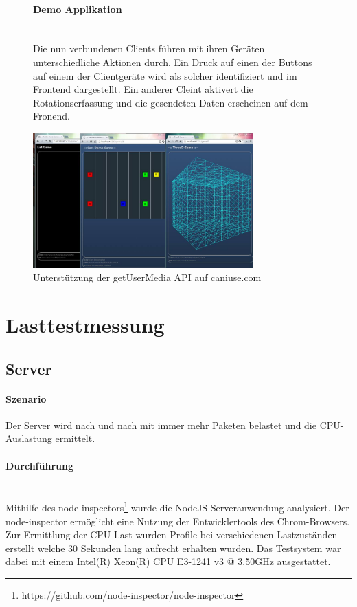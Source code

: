 \documentclass[a4paper]{spie}  %
\begin{document}
\begin{figure}[H]
\begin{minipage}[t]{0.4\textwidth}
\vspace{0pt}
\paragraph{Demo Applikation}\mbox{}\\
Die nun verbundenen Clients führen mit ihren Geräten unterschiedliche Aktionen durch. Ein Druck auf einen der Buttons auf einem der Clientgeräte wird als solcher identifiziert und im Frontend dargestellt. Ein anderer Cleint aktivert die Rotationserfassung und die gesendeten Daten erscheinen auf dem Fronend.

\end{minipage}
\hfill
\begin{minipage}[t]{0.5\textwidth}
\vspace{0pt}
    \includegraphics[width=8.5cm]{images/demoGames}
     \caption{Unterstützung der getUserMedia API auf caniuse.com}
		\label{fig:test2}
\end{minipage}
\end{figure}

\section{Lasttestmessung}\label{Lasttestmessung} %

\subsection{Server}

\paragraph{Szenario} 
Der Server wird nach und nach mit immer mehr Paketen belastet und die CPU-Auslastung ermittelt.


\paragraph{Durchführung}\mbox{}\\
Mithilfe des node-inspectors\footnote{https://github.com/node-inspector/node-inspector} wurde die NodeJS-Serveranwendung analysiert. Der node-inspector ermöglicht eine Nutzung der Entwicklertools des Chrom-Browsers. Zur Ermittlung der CPU-Last wurden Profile bei verschiedenen Lastzuständen erstellt welche 30 Sekunden lang aufrecht erhalten wurden. Das Testsystem war dabei mit einem Intel(R) Xeon(R) CPU E3-1241 v3 @ 3.50GHz ausgestattet.
\end{document}
